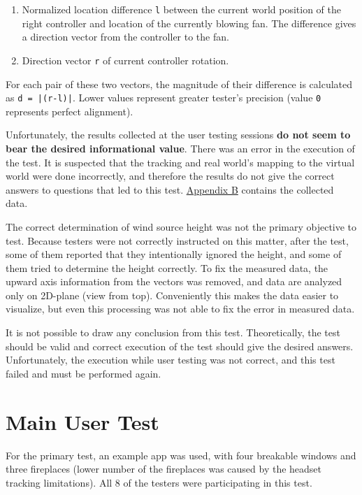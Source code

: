 \begin{enumerate}

\item{Normalized location difference \texttt{l} between the current world position of the right
controller and location of the currently blowing fan. The difference gives a direction
vector from the controller to the fan.}

\item{Direction vector \texttt{r} of current controller rotation.}

\end{enumerate}


For each pair of these two vectors, the magnitude of their difference is calculated
as \texttt{d = |(r-l)|}.
Lower values represent greater tester’s precision (value \texttt{0} represents
perfect alignment).



Unfortunately, the results collected at the user testing sessions
\textbf{do not seem to bear the desired informational value}.
There was an error in the execution of the test. It is suspected that
the tracking and real world’s mapping to the virtual world were done
incorrectly, and therefore the results do not give the correct answers to
questions that led to this test. \hyperref[appx:b]{Appendix B}
contains the collected data.


The correct determination of wind source height was not the primary
objective to test. Because testers were not correctly instructed on this matter,
after the test, some of them reported that they intentionally ignored the
height, and some of them tried to determine the height correctly.
To fix the measured data, the upward axis information from the vectors was
removed, and data are analyzed only on 2D-plane (view from top).
Conveniently this makes the data easier to visualize, but even this
processing was not able to fix the error in measured data.


It is not possible to draw any conclusion from this test. Theoretically, the
test should be valid and correct execution of the test should give the
desired answers. Unfortunately, the execution while user testing was not
correct, and this test failed and must be performed again.


\hypertarget{x-main-user-test}{\section{Main User Test}}
For the primary test, an example app was used, with four breakable windows
and three fireplaces (lower number of the fireplaces was caused by
the headset tracking limitations). All 8 of the testers were participating
in this test.


